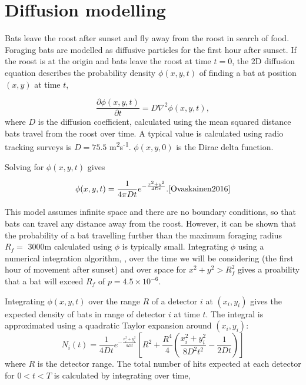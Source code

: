 \documentclass{article}
\begin{document}
\section{Diffusion modelling}

Bats leave the roost after sunset and fly away from the roost in search of food.
Foraging bats are modelled as diffusive particles for the first hour after
sunset. If the roost is at the origin and bats leave the roost at time $t =0$,
the 2D diffusion equation describes the probability density $\phi(x,y,t)$ of
finding a bat at position $(x,y)$ at time $t$,

\begin{equation}
  \frac{\partial \phi(x,y,t)}{\partial t} = D \nabla^2 \phi(x,y,t) ,
  \nonumber
\end{equation}
%
where $D$ is the diffusion coefficient, calculated using the mean squared distance bats travel from the roost over time. A typical value is calculated using radio tracking surveys is $D = 75.5$ m\textsuperscript{2}s\textsuperscript{-1}. $\phi(x,y,0)$ is
the Dirac delta function.

Solving for $\phi(x,y,t)$ gives

\begin{equation}
  \phi(x,y,t) = \frac{1}{4 \pi D t} e^{-\frac{x^2 + y^2}{4Dt}}. \cite{Ovaskainen2016}
  \nonumber
\end{equation}

This model assumes infinite space and there are no boundary conditions, so that bats can travel any distance away from the roost. However, it can be shown that the probability of a bat travelling further than the maximum foraging radius $R_f =$ 3000m calculated using $\phi$ is typically small. Integrating $\phi$ using a numerical integration algorithm, \cite{Berntsen1991}, over the time we will be considering (the first hour of movement after sunset) and over space for $x^2 + y^2 > R_f^2$ gives a proability that a bat will exceed $R_f$ of $p = 4.5 \times 10^{-6}$.

Integrating $\phi(x,y,t)$ over the range $R$ of a detector $i$ at $(x_i, y_i)$ gives
the expected density of bats in range of detector $i$ at time $t$. The
integral is approximated using a quadratic Taylor expansion around $(x_i, y_i)$:
\begin{equation}
  N_i(t) = \frac{1}{4Dt} e^{-\frac{x_i^2 + y_i^2}{4Dt}} \left[ R^2 + \frac{R^4}{4} \left( \frac{x_i^2 + y_i^2}{8D^2t^2} - \frac{1}{2Dt} \right)\right]
\end{equation}
%
where $R$ is the detector range. The total number of hits expected at each
detector for $0 < t < T$ is calculated by integrating over time,
\end{document}
